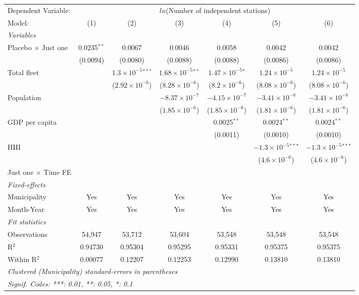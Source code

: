 \documentclass[
]{article}
\begin{document}
\begin{tabular}{lcccccc}
\tabularnewline\midrule\midrule
Dependent Variable:&\multicolumn{6}{c}{$ln$(Number of independent stations)}\\
Model:&(1) & (2) & (3) & (4) & (5) & (6)\\
\midrule \emph{Variables}&   &   &   &   &   &  \\
Placebo $\times $ Just one & 0.0235$^{**}$ & 0.0067 & 0.0046 & 0.0058 & 0.0042 & 0.0042\\
  &(0.0094) & (0.0080) & (0.0088) & (0.0088) & (0.0086) & (0.0086)\\
Total fleet &    & $1.3\times 10^{-5}$$^{***}$ & $1.68\times 10^{-5}$$^{**}$ & $1.47\times 10^{-5}$$^{*}$ & $1.24\times 10^{-5}$ & $1.24\times 10^{-5}$\\
  &   & ($2.92\times 10^{-6}$) & ($8.28\times 10^{-6}$) & ($8.2\times 10^{-6}$) & ($8.08\times 10^{-6}$) & ($8.08\times 10^{-6}$)\\
Population &    &    & $-8.37\times 10^{-7}$ & $-4.15\times 10^{-7}$ & $-3.41\times 10^{-8}$ & $-3.41\times 10^{-8}$\\
  &   &    & ($1.85\times 10^{-6}$) & ($1.85\times 10^{-6}$) & ($1.81\times 10^{-6}$) & ($1.81\times 10^{-6}$)\\
GDP per capita &    &    &    & 0.0025$^{**}$ & 0.0024$^{**}$ & 0.0024$^{**}$\\
  &   &    &    & (0.0011) & (0.0010) & (0.0010)\\
HHI &    &    &    &    & $-1.3\times 10^{-5}$$^{***}$ & $-1.3\times 10^{-5}$$^{***}$\\
  &   &    &    &    & ($4.6\times 10^{-6}$) & ($4.6\times 10^{-6}$)\\
Just one $\times$ Time FE &  &  &  &  &  & \\
\midrule \emph{Fixed-effects}&   &   &   &   &   &  \\
Municipality & Yes & Yes & Yes & Yes & Yes & Yes\\
Month-Year & Yes & Yes & Yes & Yes & Yes & Yes\\
\midrule \emph{Fit statistics}&  & & & & & \\
Observations & 54,947&53,712&53,604&53,548&53,548&53,548\\
R$^2$ & 0.94730&0.95304&0.95295&0.95331&0.95375&0.95375\\
Within R$^2$ & 0.00077&0.12207&0.12253&0.12990&0.13810&0.13810\\
\midrule\midrule\multicolumn{7}{l}{\emph{Clustered (Municipality) standard-errors in parentheses}}\\
\multicolumn{7}{l}{\emph{Signif. Codes: ***: 0.01, **: 0.05, *: 0.1}}\\
\end{tabular}
\end{document}
